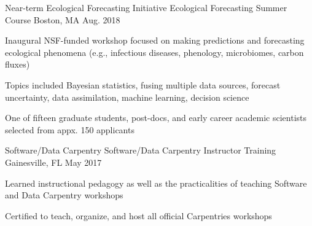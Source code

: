 

\begin{cventries}

  \cventry
    {Near-term Ecological Forecasting Initiative} %
    {Ecological Forecasting Summer Course} %
    {Boston, MA} %
    {Aug. 2018} %
    {
      \begin{cvitems} %
        \item {Inaugural NSF-funded workshop focused on making predictions and forecasting ecological phenomena (e.g., infectious diseases, phenology, microbiomes, carbon fluxes)}
        \item {Topics included Bayesian statistics, fusing multiple data sources, forecast uncertainty, data assimilation, machine learning, decision science}
        \item {One of fifteen graduate students, post-docs, and early career academic scientists selected from appx. 150 applicants}
      \end{cvitems}
    }


  \cventry
    {Software/Data Carpentry} %
    {Software/Data Carpentry Instructor Training} %
    {Gainesville, FL} %
    {May 2017} %
    {
      \begin{cvitems} %
        \item {Learned instructional pedagogy as well as the practicalities of teaching Software and Data Carpentry workshops}
        \item {Certified to teach, organize, and host all official Carpentries workshops}
      \end{cvitems}
    }



\end{cventries}
